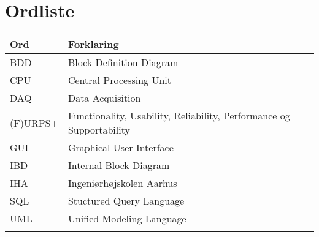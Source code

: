 \chapter{Ordliste}

\begin{longtabu} to 
    Ord &    Forklaring\\
    \toprule 
    BDD & Block Definition Diagram \\	 
    CPU & Central Processing Unit\\   
    DAQ & Data Acquisition\\
    (F)URPS+ & Functionality, Usability, Reliability, Performance og Supportability\\
	GUI & Graphical User Interface\\
	IBD & Internal Block Diagram\\
	IHA & Ingeniørhøjskolen Aarhus\\
	SQL & Stuctured Query Language\\
	UML & Unified Modeling Language\\
	
	
	
\label{forkort}
\end{longtabu}